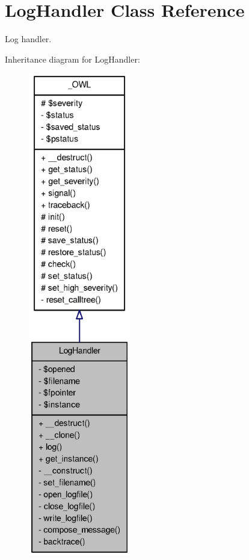 \section{LogHandler Class Reference}
\label{classLogHandler}


Log handler.  




Inheritance diagram for LogHandler:\nopagebreak
\begin{figure}[H]
\begin{center}
\leavevmode
\includegraphics[height=600pt]{classLogHandler__inherit__graph}
\end{center}
\end{figure}


